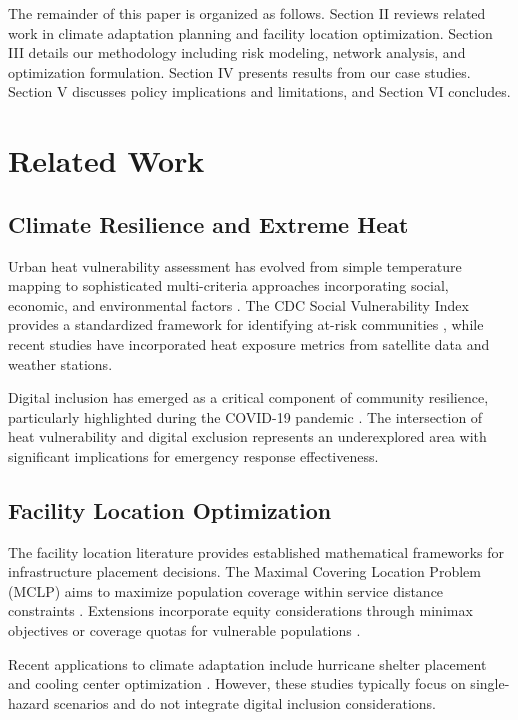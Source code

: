 \documentclass[conference]{IEEEtran}
\begin{document}
The remainder of this paper is organized as follows. Section II reviews related work in climate adaptation planning and facility location optimization. Section III details our methodology including risk modeling, network analysis, and optimization formulation. Section IV presents results from our case studies. Section V discusses policy implications and limitations, and Section VI concludes.

\section{Related Work}

\subsection{Climate Resilience and Extreme Heat}

Urban heat vulnerability assessment has evolved from simple temperature mapping to sophisticated multi-criteria approaches incorporating social, economic, and environmental factors \cite{heat2023}. The CDC Social Vulnerability Index provides a standardized framework for identifying at-risk communities \cite{cdc2023}, while recent studies have incorporated heat exposure metrics from satellite data and weather stations.

Digital inclusion has emerged as a critical component of community resilience, particularly highlighted during the COVID-19 pandemic \cite{digital2022}. The intersection of heat vulnerability and digital exclusion represents an underexplored area with significant implications for emergency response effectiveness.

\subsection{Facility Location Optimization}

The facility location literature provides established mathematical frameworks for infrastructure placement decisions. The Maximal Covering Location Problem (MCLP) aims to maximize population coverage within service distance constraints \cite{church1974}. Extensions incorporate equity considerations through minimax objectives or coverage quotas for vulnerable populations \cite{equity2020}.

Recent applications to climate adaptation include hurricane shelter placement \cite{hurricane2021} and cooling center optimization \cite{cooling2022}. However, these studies typically focus on single-hazard scenarios and do not integrate digital inclusion considerations.
\end{document}
